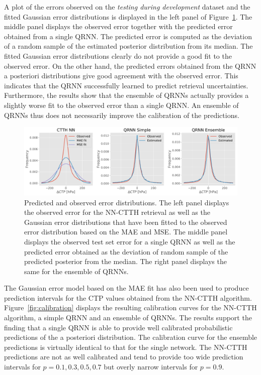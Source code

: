 \documentclass[journal abbreviation, manuscript]{copernicus}
\begin{document}
A plot of the errors observed on the \textit{testing during development} dataset
and the fitted Gaussian error distributions is displayed in the left panel of
Figure~\ref{fig:error_fit}. The middle panel displays the observed error
together with the predicted error obtained from a single QRNN. The predicted
error is computed as the deviation of a random sample of the estimated posterior
distribution from its median. The fitted Gaussian error distributions clearly do
not provide a good fit to the observed error. On the other hand, the predicted
 errors obtained from the QRNN a posteriori distributions give good agreement with
the observed error. This indicates that the QRNN successfully learned to predict
retrieval uncertainties. Furthermore, the results show that the ensemble of
QRNNs actually provides a slightly worse fit to the observed error than a single
QRNN. An ensemble of QRNNs thus does not necessarily improve the calibration of
the predictions.

  \begin{figure}[hbpt!]
    \centering
    \includegraphics[width = 1.0\linewidth]{../plots/ctp_error_fit}
    \caption{Predicted and observed error distributions. The left panel
      displays the observed error for the NN-CTTH retrieval as well as the
      Gaussian error distributions that have been fitted to the observed
      error distribution based on the MAE and MSE. The middle panel
      displays the observed test set error for a single QRNN as well as the
      predicted error obtained as the deviation of random sample of the
      predicted posterior from the median. The right panel displays
      the same for the ensemble
      of QRNNs.}
    \label{fig:error_fit}
  \end{figure}

The Gaussian error model based on the MAE fit has also been used to produce
prediction intervals for the CTP values obtained from the NN-CTTH algorithm.
Figure~\ref{fig:calibration} displays the resulting calibration curves for the
NN-CTTH algorithm, a simple QRNN and an ensemble of QRNNs. The results
support the finding that a single QRNN is able to provide well calibrated
probabilistic predictions of the a posteriori distribution. The calibration
curve for the ensemble predictions is virtually identical to that for the single
network. The NN-CTTH predictions are not as well calibrated and tend to provide
too wide prediction intervals for $p = 0.1, 0.3, 0.5, 0.7$ but
overly narrow intervals for $p = 0.9$.
\end{document}
